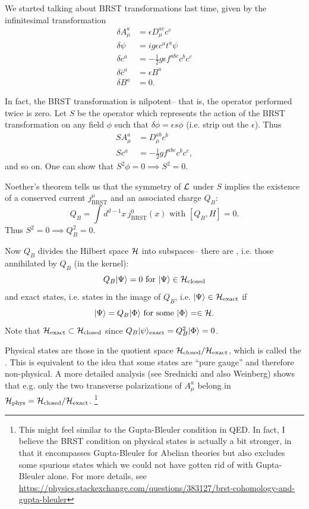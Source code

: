 We started talking about BRST transformations last time, given by the infinitesimal transformation
\begin{align*}
    \delta A_\mu^a &= \epsilon D_\mu^{ac} c^c\\
    \delta \psi &= ig \epsilon c^a t^a \psi\\
    \delta c^a &= -\frac{1}{2} g\epsilon f^{abc} c^b c^c\\
    \delta \bar c^a &= \epsilon B^a\\
    \delta B^a &= 0.
\end{align*}

In fact, the BRST transformation is nilpotent-- that is, the operator performed twice is zero. Let $S$ be the operator which represents the action of the BRST transformation on any field $\phi$ such that $\delta \phi = \epsilon s \phi$ (i.e. strip out the $\epsilon$). Thus
\begin{align}
    SA_\mu^a &= D^{ab}_\mu c^b\\
    Sc^a &= -\frac{1}{2} g f^{abc} c^b c^c,
\end{align}
and so on. One can show that $S^2\phi=0\implies S^2=0$.

Noether's theorem tells us that the symmetry of $\mathcal L$ under $S$ implies the existence of a conserved current $j^\mu_\text{BRST}$ and an associated charge $Q_B$:
\begin{equation}
    Q_B =\int d^{d-1}x \,j^0_\text{BRST}(x)\text{ with }[Q_B,H]=0.
\end{equation}
Thus $S^2=0 \implies Q_B^2=0$.

Now $Q_B$ divides the Hilbert space $\mathcal H$ into subspaces-- there are , i.e. those annihilated by $Q_B$ (in the kernel):
\begin{equation}
    Q_B \lvert\Psi\rangle=0 \text{ for }\lvert\Psi\rangle\in \mathcal H_{\text{closed}}
\end{equation}
and exact states, i.e. states in the image of $Q_B$, i.e. $\lvert\Psi\rangle\in \mathcal H_\text{exact}$ if
\begin{equation}
    \lvert\Psi\rangle = Q_B \lvert\Phi\rangle \text{ for some }\lvert\Phi\rangle =\in \mathcal H.
\end{equation}
Note that $\mathcal H_\text{exact} \subset \mathcal H_\text{closed}$ since $Q_B \lvert\psi\rangle_{\text{exact}}=Q^2_B \lvert\Phi\rangle=0$.

Physical states are those in the quotient space $\mathcal H_\text{closed}/\mathcal H_\text{exact}$, which is called the . This is equivalent to the idea that some states are ``pure gauge'' and therefore non-physical. A more detailed analysis (see Srednicki and also Weinberg) shows that e.g. only the two transverse polarizations of $A_\mu^a$ belong in $\mathcal H_\text{phys}=\mathcal H_\text{closed}/\mathcal H_\text{exact}$.%
    \footnote{This might feel similar to the Gupta-Bleuler condition in QED. In fact, I believe the BRST condition on physical states is actually a bit stronger, in that it encompasses Gupta-Bleuler for Abelian theories but also excludes some spurious states which we could not have gotten rid of with Gupta-Bleuler alone. For more details, see \url{https://physics.stackexchange.com/questions/383127/brst-cohomology-and-gupta-bleuler}}

